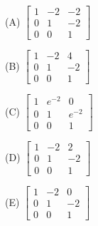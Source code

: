 \documentclass[12pt]{amsart}
\begin{document}
\noindent
\begin{minipage}{0.33\textwidth}\centering
(A) $\begin{bmatrix} 1 & -2 & -2 \\ 0 & 1 & -2 \\ 0 & 0 & 1 \end{bmatrix}$
\end{minipage}%
\begin{minipage}{0.33\textwidth}\centering
(B) $\begin{bmatrix} 1 & -2 & 4 \\ 0 & 1 & -2 \\ 0 & 0 & 1 \end{bmatrix}$
\end{minipage}%
\begin{minipage}{0.33\textwidth}\centering
(C) $\begin{bmatrix} 1 & e^{-2} & 0 \\ 0 & 1 & e^{-2} \\ 0 & 0 & 1 \end{bmatrix}$
\end{minipage}

\medskip
\noindent
\begin{minipage}{0.5\textwidth}\centering
(D) $\begin{bmatrix} 1 & -2 & 2 \\ 0 & 1 & -2 \\ 0 & 0 & 1 \end{bmatrix}$
\end{minipage}%
\begin{minipage}{0.5\textwidth}\centering
(E) $\begin{bmatrix} 1 & -2 & 0 \\ 0 & 1 & -2 \\ 0 & 0 & 1 \end{bmatrix}$
\end{minipage}
\end{document}
